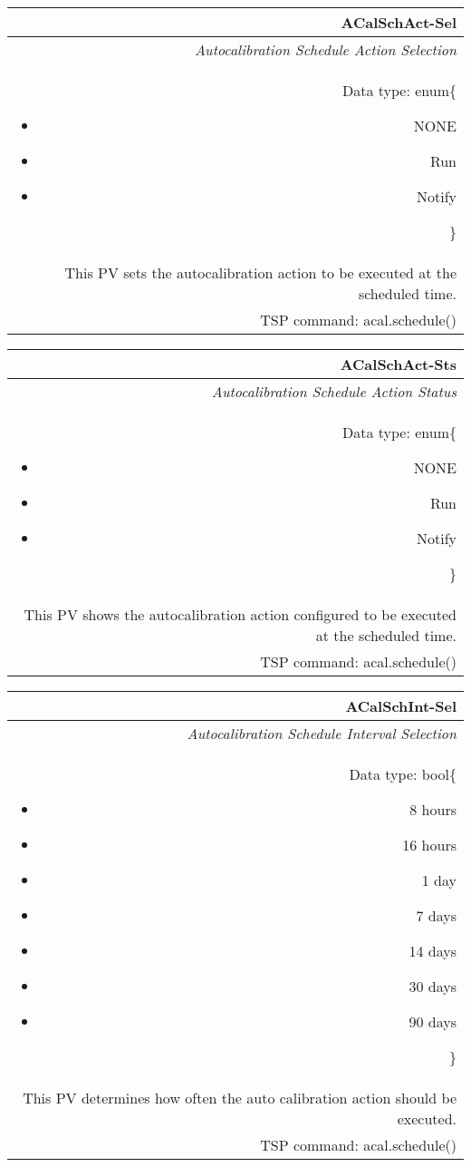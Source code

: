 \documentclass[openany]{article}
\begin{document}
		\begin{tabular}{N}
			\hline
			\bfseries ACalSchAct-Sel\label{pv:acalschact-sel} \\ \hline
			\emph{Autocalibration Schedule Action Selection} \\
			Data type: enum\{\begin{itemize}[noitemsep]
				\small
				\item[] NONE
				\item[] Run
				\item[] Notify
			\end{itemize}\} \\
			This PV sets the autocalibration action to be executed at the scheduled time. \\
			TSP command: acal.schedule()
		\end{tabular}

		\begin{tabular}{N}
			\hline
			\bfseries ACalSchAct-Sts\label{pv:acalschact-sts} \\ \hline
			\emph{Autocalibration Schedule Action Status} \\
			Data type: enum\{\begin{itemize}[noitemsep]
				\small
				\item[] NONE
				\item[] Run
				\item[] Notify
			\end{itemize}\} \\
			This PV shows the autocalibration action configured to be executed at the scheduled time. \\
			TSP command: acal.schedule()
		\end{tabular}

		\begin{tabular}{N}
			\hline
			\bfseries ACalSchInt-Sel\label{pv:acalschint-sel} \\ \hline
			\emph{Autocalibration Schedule Interval Selection} \\
			Data type: bool\{\begin{itemize}[noitemsep]
				\small
				\item[] 8 hours
				\item[] 16 hours
				\item[] 1 day
				\item[] 7 days
				\item[] 14 days
				\item[] 30 days
				\item[] 90 days
			\end{itemize}\} \\
			This PV determines how often the auto calibration action should be executed. \\
			TSP command: acal.schedule()
		\end{tabular}
\end{document}
